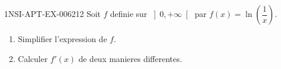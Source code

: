\begin{exercice}{1NSI-APT-EX-006}{2}{12}
Soit $f$ definie sur $\left]0, +\infty\right[$ par $f(x) = \ln\!\left(\dfrac{1}{x}\right)$.
\begin{enumerate}
  \item Simplifier l'expression de $f$.
  \item Calculer $f'(x)$ de deux manieres differentes.
\end{enumerate}

\end{exercice}
